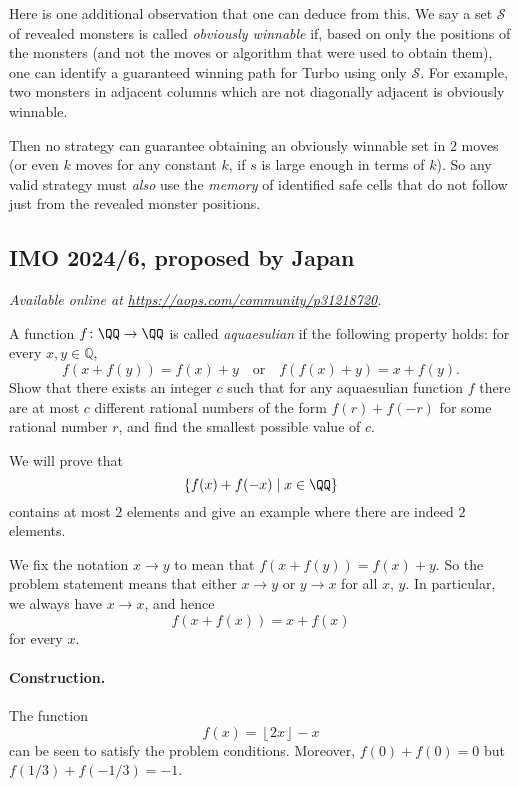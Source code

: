 \documentclass[11pt]{scrartcl}
\begin{document}
\begin{remark*}
  Here is one additional observation that one can deduce from this.
  We say a set $\mathcal S$ of revealed monsters is called \emph{obviously winnable} if,
  based on only the positions of the monsters
  (and not the moves or algorithm that were used to obtain them),
  one can identify a guaranteed winning path for Turbo using only $\mathcal S$.
  For example, two monsters in adjacent columns which are not diagonally
  adjacent is obviously winnable.

  Then no strategy can guarantee obtaining an obviously winnable set in $2$ moves
  (or even $k$ moves for any constant $k$, if $s$ is large enough in terms of $k$).
  So any valid strategy must \emph{also} use the \emph{memory} of identified safe cells
  that do not follow just from the revealed monster positions.
\end{remark*}
\pagebreak

\subsection{IMO 2024/6, proposed by Japan}
\textsl{Available online at \url{https://aops.com/community/p31218720}.}
\begin{mdframed}[style=mdpurplebox,frametitle={Problem statement}]
A function $f \colon \QQ \to \QQ$ is called \emph{aquaesulian}
if the following property holds: for every $x,y \in \mathbb{Q}$,
\[ f(x+f(y)) = f(x) + y \quad \text{or} \quad f(f(x)+y) = x + f(y). \]
Show that there exists an integer $c$ such that for any aquaesulian function $f$
there are at most $c$ different rational numbers of the
form $f(r) + f(-r)$ for some rational number $r$,
and find the smallest possible value of $c$.
\end{mdframed}
We will prove that
\[ \left\{ f(x) + f(-x) \mid x \in \QQ \right\} \]
contains at most $2$ elements
and give an example where there are indeed $2$ elements.

We fix the notation $x \to y$ to mean that $f(x+f(y)) = f(x)+y$.
So the problem statement means that either $x \to y$ or $y \to x$ for all $x$, $y$.
In particular, we always have $x \to x$, and hence
\[ f(x+f(x)) = x+f(x) \]
for every $x$.

\paragraph{Construction.}
The function
\[ f(x) = \left\lfloor 2x \right\rfloor - x \]
can be seen to satisfy the problem conditions.
Moreover, $f(0)+f(0) = 0$ but $f(1/3)+f(-1/3) = -1$.
\end{document}
